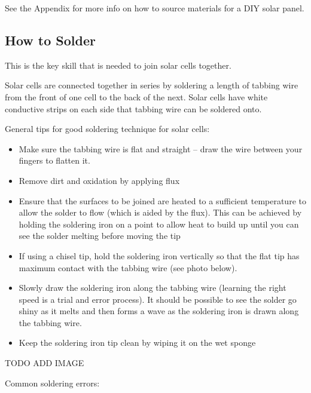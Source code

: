 \documentclass{article}
\theoremstyle{definition}
\theoremstyle{definition}
\theoremstyle{remark}
\begin{document}
    See the Appendix for more info on how to source materials for a DIY solar panel.
  

  \subsection{How to Solder} %
  \label{sub:how_to_solder}

    This is the key skill that is needed to join solar cells together.

    Solar cells are connected together in series by soldering a length of tabbing wire from the front of one cell to the back of the next. Solar cells have white conductive strips on each side that tabbing wire can be soldered onto. 

    General tips for good soldering technique for solar cells:

    \begin{itemize}
      \item Make sure the tabbing wire is flat and straight – draw the wire between your fingers to flatten it.
      \item Remove dirt and oxidation by applying flux
      \item Ensure that the surfaces to be joined are heated to a sufficient temperature to allow the solder to flow (which is aided by the flux). This can be achieved by holding the soldering iron on a point to allow heat to build up until you can see the solder melting before moving the tip
      \item If using a chisel tip, hold the soldering iron vertically so that the flat tip has maximum contact with the tabbing wire (see photo below).
      \item Slowly draw the soldering iron along the tabbing wire (learning the right speed is a trial and error process). It should be possible to see the solder go shiny as it melts and then forms a wave as the soldering iron is drawn along the tabbing wire.
      \item Keep the soldering iron tip clean by wiping it on the wet sponge
    \end{itemize}

    TODO ADD IMAGE

    Common soldering errors:
\end{document}
